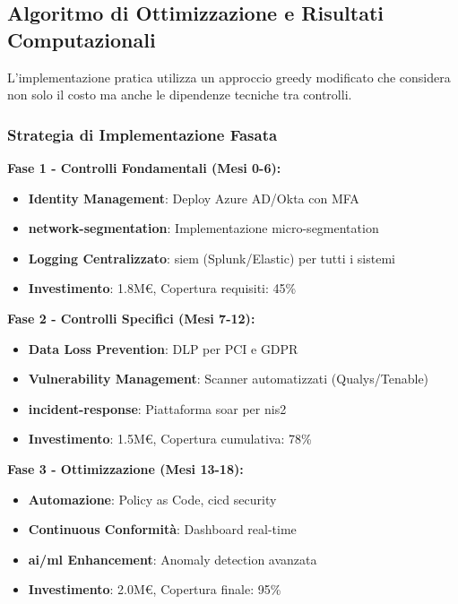 \subsection{Algoritmo di Ottimizzazione e Risultati Computazionali}

L'implementazione pratica utilizza un approccio greedy modificato che considera non solo il costo ma anche le dipendenze tecniche tra controlli\autocite{Chvatal1979}.

\subsubsection{Strategia di Implementazione Fasata}

\textbf{Fase 1 - Controlli Fondamentali (Mesi 0-6):}
\begin{itemize}
    \item \textbf{Identity Management}: Deploy Azure AD/Okta con MFA
    \item \textbf{\gls{network-segmentation}}: Implementazione \gls{micro-segmentation}
    \item \textbf{Logging Centralizzato}: \gls{siem} (Splunk/Elastic) per tutti i sistemi
    \item \textbf{Investimento}: 1.8M€, Copertura requisiti: 45\%
\end{itemize}

\textbf{Fase 2 - Controlli Specifici (Mesi 7-12):}
\begin{itemize}
    \item \textbf{Data Loss Prevention}: DLP per PCI e GDPR
    \item \textbf{Vulnerability Management}: Scanner automatizzati (Qualys/Tenable)
    \item \textbf{\gls{incident-response}}: Piattaforma \gls{soar} per \gls{nis2}
    \item \textbf{Investimento}: 1.5M€, Copertura cumulativa: 78\%
\end{itemize}

\textbf{Fase 3 - Ottimizzazione (Mesi 13-18):}
\begin{itemize}
    \item \textbf{Automazione}: Policy as Code, \gls{cicd} security
    \item \textbf{Continuous Conformità}: Dashboard real-time
    \item \textbf{\gls{ai}/\gls{ml} Enhancement}: Anomaly detection avanzata
    \item \textbf{Investimento}: 2.0M€, Copertura finale: 95\%
\end{itemize}

